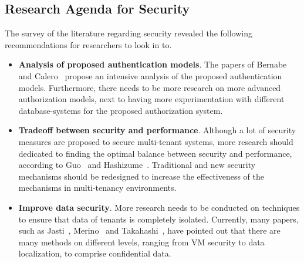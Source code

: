 \subsection{Research Agenda for Security}\label{sec:security_agenda}
The survey of the literature regarding security revealed the following recommendations for researchers to look in to. 
\begin{itemize}
    \item \textbf{Analysis of proposed authentication models}.
        The papers of Bernabe~\cite{Bernabe2012Auth} and Calero~\cite{Calero2010Auth} propose an intensive analysis of the proposed authentication models. 
        Furthermore, there needs to be more research on more advanced authorization models, next to having more experimentation with different database-systems for the proposed authorization system.
    \item \textbf{Tradeoff between security and performance}.
        Although a lot of security measures are proposed to secure multi-tenant systems, more research should dedicated to finding the optimal balance between security and performance, according to Guo~\cite{guo2007framework} and Hashizume~\cite{Hashizume2013Security}. 
        Traditional and new security mechanisms should be redesigned to increase the effectiveness of the mechanisms in multi-tenancy environments.
    \item \textbf{Improve data security}.
        More research needs to be conducted on techniques to ensure that data of tenants is completely isolated. 
        Currently, many papers, such as Jasti~\cite{Jasti2010Security}, Merino~\cite{Merino2011Security} and Takahashi~\cite{Takahashi2012Security}, have pointed out that there are many methods on different levels, ranging from VM security to data localization, to comprise confidential data. 
\end{itemize}

